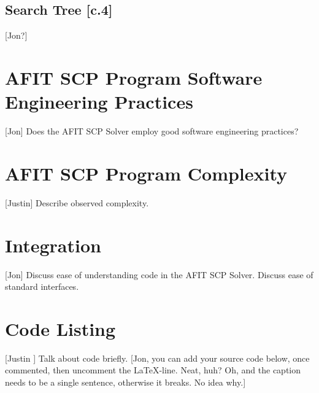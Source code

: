 \documentclass[12pt]{article}
\begin{document}
\subsection{Search Tree [c.4]} 
[Jon?]
\section{AFIT SCP Program Software Engineering Practices} \label{scn:design}

[Jon] Does the AFIT SCP Solver employ good software engineering practices?

\section{AFIT SCP Program Complexity} \label{scn:design}

[Justin] Describe observed complexity.

\section{Integration} \label{scn:design}

[Jon] Discuss ease of understanding code in the AFIT SCP Solver. Discuss ease of standard interfaces.

\pagebreak
\appendix		%

\section{Code Listing}

[Justin ] Talk about code briefly.
[Jon, you can add your source code below, once commented, then uncomment the \LaTeX -line. Neat, huh? Oh, and the caption needs to be a single sentence, otherwise it breaks. No idea why.]
%



\end{document}
